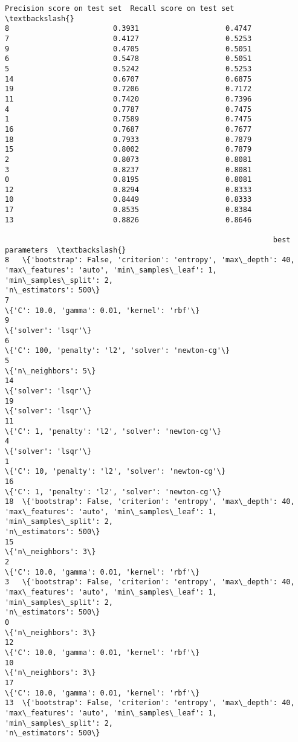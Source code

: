 \documentclass[11pt]{article}
\begin{document}
\begin{tcolorbox}[breakable, size=fbox, boxrule=.5pt, pad at break*=1mm, opacityfill=0]
\begin{Verbatim}[commandchars=\\\{\}]
    Precision score on test set  Recall score on test set  \textbackslash{}
8                        0.3931                    0.4747
7                        0.4127                    0.5253
9                        0.4705                    0.5051
6                        0.5478                    0.5051
5                        0.5242                    0.5253
14                       0.6707                    0.6875
19                       0.7206                    0.7172
11                       0.7420                    0.7396
4                        0.7787                    0.7475
1                        0.7589                    0.7475
16                       0.7687                    0.7677
18                       0.7933                    0.7879
15                       0.8002                    0.7879
2                        0.8073                    0.8081
3                        0.8237                    0.8081
0                        0.8195                    0.8081
12                       0.8294                    0.8333
10                       0.8449                    0.8333
17                       0.8535                    0.8384
13                       0.8826                    0.8646

                                                              best parameters  \textbackslash{}
8   \{'bootstrap': False, 'criterion': 'entropy', 'max\_depth': 40,
'max\_features': 'auto', 'min\_samples\_leaf': 1, 'min\_samples\_split': 2,
'n\_estimators': 500\}
7
\{'C': 10.0, 'gamma': 0.01, 'kernel': 'rbf'\}
9
\{'solver': 'lsqr'\}
6
\{'C': 100, 'penalty': 'l2', 'solver': 'newton-cg'\}
5
\{'n\_neighbors': 5\}
14
\{'solver': 'lsqr'\}
19
\{'solver': 'lsqr'\}
11
\{'C': 1, 'penalty': 'l2', 'solver': 'newton-cg'\}
4
\{'solver': 'lsqr'\}
1
\{'C': 10, 'penalty': 'l2', 'solver': 'newton-cg'\}
16
\{'C': 1, 'penalty': 'l2', 'solver': 'newton-cg'\}
18  \{'bootstrap': False, 'criterion': 'entropy', 'max\_depth': 40,
'max\_features': 'auto', 'min\_samples\_leaf': 1, 'min\_samples\_split': 2,
'n\_estimators': 500\}
15
\{'n\_neighbors': 3\}
2
\{'C': 10.0, 'gamma': 0.01, 'kernel': 'rbf'\}
3   \{'bootstrap': False, 'criterion': 'entropy', 'max\_depth': 40,
'max\_features': 'auto', 'min\_samples\_leaf': 1, 'min\_samples\_split': 2,
'n\_estimators': 500\}
0
\{'n\_neighbors': 3\}
12
\{'C': 10.0, 'gamma': 0.01, 'kernel': 'rbf'\}
10
\{'n\_neighbors': 3\}
17
\{'C': 10.0, 'gamma': 0.01, 'kernel': 'rbf'\}
13  \{'bootstrap': False, 'criterion': 'entropy', 'max\_depth': 40,
'max\_features': 'auto', 'min\_samples\_leaf': 1, 'min\_samples\_split': 2,
'n\_estimators': 500\}


\end{Verbatim}
\end{tcolorbox}
\end{document}
